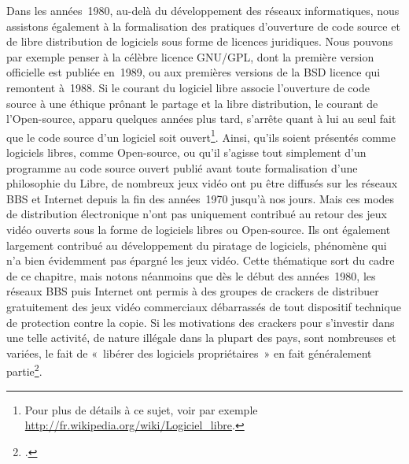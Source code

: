\documentclass{FramateX}
\begin{document}
\begin{refsection}
Dans les années~1980, au-delà du développement des réseaux
informatiques, nous assistons également à la formalisation des
pratiques d'ouverture de code source et de libre distribution de
logiciels sous forme de licences juridiques. Nous pouvons par exemple
penser à la célèbre licence GNU/GPL, dont la première version
officielle est publiée en~1989, ou aux premières versions de la BSD
licence qui remontent à~1988. Si le courant du logiciel libre associe
l'ouverture de code source à une éthique prônant le partage et la libre
distribution, le courant de l'Open-source, apparu quelques années plus
tard, s'arrête quant à lui au seul fait que le code source d'un
logiciel soit ouvert\footnote{Pour plus de détails à ce sujet, voir
par exemple \url{http://fr.wikipedia.org/wiki/Logiciel_libre}.}. Ainsi,
qu'ils soient présentés comme logiciels libres, comme Open-source, ou
qu'il s'agisse tout simplement d'un programme au code source ouvert
publié avant toute formalisation d'une philosophie du Libre, de
nombreux jeux vidéo ont pu être diffusés sur les réseaux BBS et
Internet depuis la fin des années~1970 jusqu'à nos jours. Mais ces
modes de distribution électronique n'ont pas uniquement contribué au
retour des jeux vidéo ouverts sous la forme de logiciels libres ou
Open-source. Ils ont également largement contribué au développement du
piratage de logiciels, phénomène qui n'a bien évidemment pas épargné
les jeux vidéo. Cette thématique sort du cadre de ce chapitre, mais
notons néanmoins que dès le début des années~1980, les réseaux BBS puis
Internet ont permis à des groupes de crackers de distribuer
gratuitement des jeux vidéo commerciaux débarrassés de tout dispositif
technique de protection contre la copie. Si les motivations des
crackers pour s'investir dans une telle activité, de nature illégale
dans la plupart des pays, sont nombreuses et variées, le fait de
«~libérer des logiciels propriétaires~» en fait généralement partie\footnote{\cite{craigsoftware2005}.}.



\end{refsection}
\end{document}
